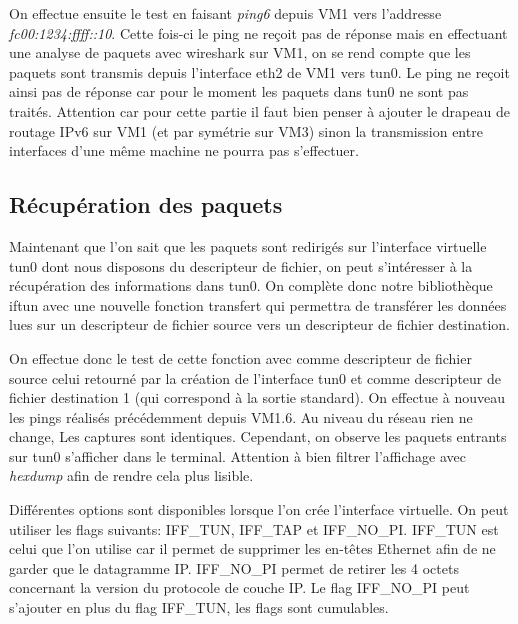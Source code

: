 \documentclass[a4paper, 12pt]{article}
\begin{document}
    On effectue ensuite le test en faisant \textit{ping6} depuis VM1 vers
    l'addresse \textit{fc00:1234:ffff::10}. Cette fois-ci le ping ne reçoit 
    pas de réponse mais en effectuant une analyse de paquets avec wireshark
    sur VM1, on se rend compte que les paquets sont transmis depuis 
    l'interface eth2 de VM1 vers tun0. Le ping ne reçoit ainsi pas de réponse 
    car pour le moment les paquets dans tun0 ne sont pas traités. Attention 
    car pour cette partie il faut bien penser à ajouter le drapeau de routage
    IPv6 sur VM1 (et par symétrie sur VM3) sinon la transmission entre 
    interfaces d'une même machine ne pourra pas s'effectuer. 

    \subsection{Récupération des paquets}
    Maintenant que l'on sait que les paquets sont redirigés sur l'interface
    virtuelle tun0 dont nous disposons du descripteur de fichier, on peut 
    s'intéresser à la récupération des informations dans tun0. On complète
    donc notre bibliothèque iftun avec une nouvelle fonction transfert qui
    permettra de transférer les données lues sur un descripteur de fichier
    source vers un descripteur de fichier destination.

    \medbreak{}

    On effectue donc le test de cette fonction avec comme descripteur de 
    fichier source celui retourné par la création de l'interface tun0 et
    comme descripteur de fichier destination 1 (qui correspond à la 
    sortie standard). On effectue à nouveau les pings réalisés précédemment
    depuis VM1.6. Au niveau du réseau rien ne change, Les captures sont 
    identiques. Cependant, on observe les paquets entrants sur tun0 s'afficher
    dans le terminal. Attention à bien filtrer l'affichage avec 
    \textit{hexdump} afin de rendre cela plus lisible.

    \medbreak{}

    Différentes options sont disponibles lorsque l'on crée l'interface 
    virtuelle. On peut utiliser les flags suivants: IFF\_TUN, IFF\_TAP et
    IFF\_NO\_PI. IFF\_TUN est celui que l'on utilise car il permet de 
    supprimer les en-têtes Ethernet afin de ne garder que le datagramme IP.
    IFF\_NO\_PI permet de retirer les 4 octets concernant la version du 
    protocole de couche IP. Le flag IFF\_NO\_PI peut s'ajouter en plus du 
    flag IFF\_TUN, les flags sont cumulables.
\end{document}

